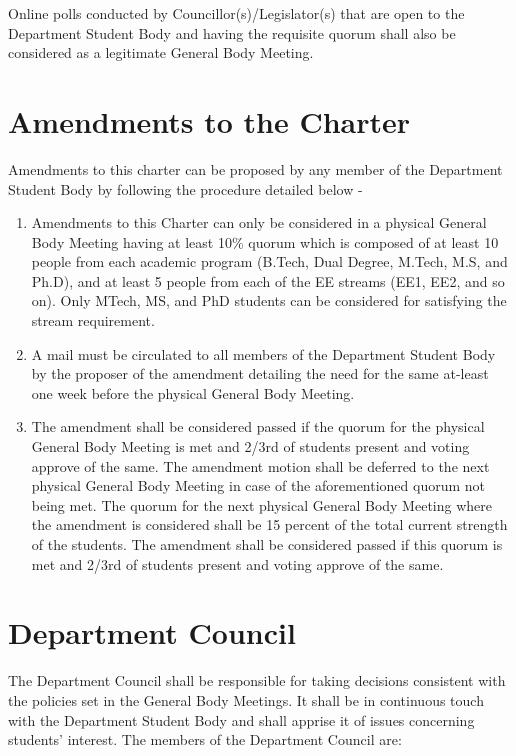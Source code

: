 \documentclass[12pt]{charter}
\begin{document}
Online polls conducted by Councillor(s)/Legislator(s) that are open to the Department Student Body and having the requisite quorum shall also be considered as a legitimate General Body Meeting.

\section{Amendments to the Charter}
Amendments to this charter can be proposed by any member of the Department Student Body by
following the procedure detailed below -

\begin{enumerate}
	\item Amendments to this Charter can only be considered in a physical General Body Meeting having at least 10\% quorum which is composed of at least 10 people from each academic program (B.Tech, Dual Degree, M.Tech, M.S, and Ph.D), and at least 5 people from each of the EE streams (EE1, EE2, and so on). Only MTech, MS, and PhD	students can be considered for satisfying the stream requirement.
	\item A mail must be circulated to all members of the Department Student Body by the proposer of the amendment detailing the need for the same at-least one week before the	physical General Body Meeting.
	\item The amendment shall be considered passed if the quorum for the physical General Body Meeting	is met and 2/3rd of students present and voting approve of the same. The amendment	motion shall be deferred to the next physical General Body Meeting in case of the aforementioned quorum not being met. The quorum for the next physical General Body Meeting where the amendment is considered shall be 15 percent of the total current strength of the students. The amendment shall be considered passed if this quorum is met and 2/3rd of students present and voting approve of the same.
\end{enumerate}

\pagebreak



\section{Department Council}

The Department Council shall be responsible for taking decisions consistent with the policies set in the General Body Meetings. It shall be in continuous touch with the Department Student Body and shall apprise it of issues concerning students’ interest. The members of the Department Council are:
\end{document}

